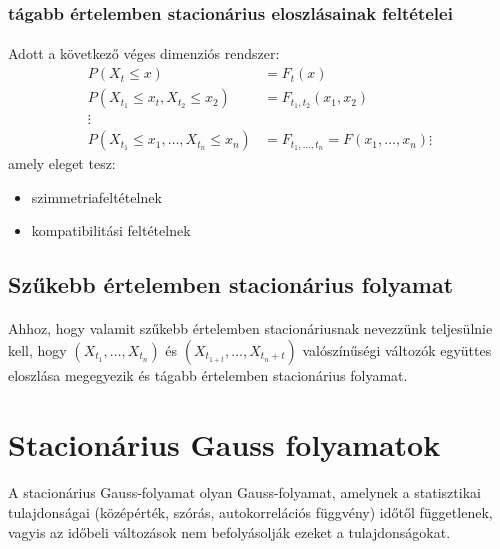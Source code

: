 \documentclass[11pt,a4pape,draftr]{article}
\begin{document}
				\subsubsection{tágabb értelemben stacionárius eloszlásainak feltételei}
					\paragraph{}
						Adott a következő véges dimenziós rendszer:
						$$\begin{aligned}
							P(X_t \le x) &= F_t(x) \\
							P(X_{t_1} \le x_t, X_{t_2} \le x_2) &=F_{t_1,t_2}(x_1,x_2) \\
							\vdots \\
							P(X_{t_1} \le x_1 , \dots, X_{t_n} \le x_n) &= F_{t_1, \dots, t_n}=F(x_1, \dots, x_n)
							\vdots
						\end{aligned}$$
						amely eleget tesz:
						\begin{itemize}
							\item szimmetriafeltételnek
							\item kompatibilitási feltételnek
						\end{itemize}

			\subsection{Szűkebb értelemben stacionárius folyamat}
				\paragraph{}

				Ahhoz, hogy valamit szűkebb értelemben stacionáriusnak nevezzünk teljesülnie kell, hogy $(X_{t_1}, \dots , X_{t_n})$ és $(X_{t_{1+t}}, \dots, X_{t_n + t})$ valószínűségi változók  együttes eloszlása megegyezik és tágabb értelemben stacionárius folyamat.

		\section{Stacionárius Gauss folyamatok}
			\paragraph{}
				A stacionárius Gauss-folyamat olyan Gauss-folyamat, amelynek a statisztikai tulajdonságai (középérték, szórás, autokorrelációs függvény) időtől függetlenek, vagyis az időbeli változások nem befolyásolják ezeket a tulajdonságokat.
\end{document}
